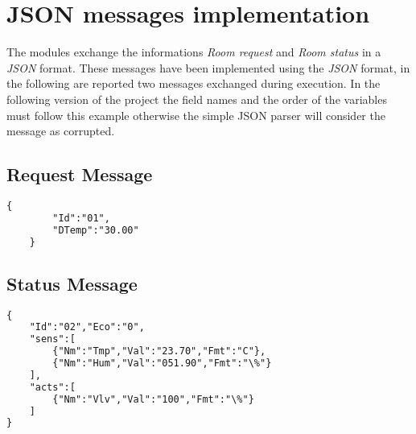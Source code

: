 \section{JSON messages implementation}
The modules exchange the informations \textit{Room request} and \textit{Room status} in a \textit{JSON} format.
These messages have been implemented using the \textit{JSON} format, in the following are reported two messages exchanged during execution.
In the following version of the project the field names and the order of the variables must follow this example otherwise the simple JSON parser will consider the message as corrupted.

\subsection{Request Message}
\lstset{style=custompython}
\begin{lstlisting}[language=XML]
	{
		"Id":"01",
		"DTemp":"30.00"
	}
\end{lstlisting}

\subsection{Status Message}
\lstset{style=custompython}
\begin{lstlisting}[language=XML]
{
	"Id":"02","Eco":"0",
	"sens":[
		{"Nm":"Tmp","Val":"23.70","Fmt":"C"},
		{"Nm":"Hum","Val":"051.90","Fmt":"\%"}
	],
	"acts":[
		{"Nm":"Vlv","Val":"100","Fmt":"\%"}
	]
}
\end{lstlisting}